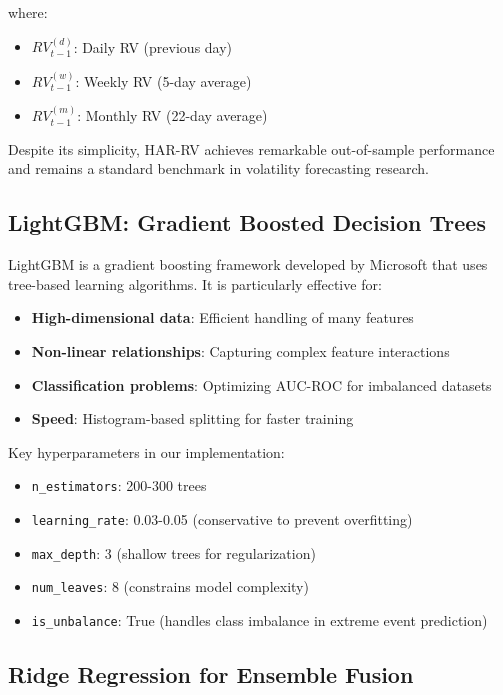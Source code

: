 \documentclass[12pt,a4paper]{article}
\begin{document}
where:
\begin{itemize}
    \item $RV_{t-1}^{(d)}$: Daily RV (previous day)
    \item $RV_{t-1}^{(w)}$: Weekly RV (5-day average)
    \item $RV_{t-1}^{(m)}$: Monthly RV (22-day average)
\end{itemize}

Despite its simplicity, HAR-RV achieves remarkable out-of-sample performance and remains a standard benchmark in volatility forecasting research.

\subsection{LightGBM: Gradient Boosted Decision Trees}

LightGBM is a gradient boosting framework developed by Microsoft that uses tree-based learning algorithms. It is particularly effective for:

\begin{itemize}
    \item \textbf{High-dimensional data}: Efficient handling of many features
    \item \textbf{Non-linear relationships}: Capturing complex feature interactions
    \item \textbf{Classification problems}: Optimizing AUC-ROC for imbalanced datasets
    \item \textbf{Speed}: Histogram-based splitting for faster training
\end{itemize}

Key hyperparameters in our implementation:
\begin{itemize}
    \item \texttt{n\_estimators}: 200-300 trees
    \item \texttt{learning\_rate}: 0.03-0.05 (conservative to prevent overfitting)
    \item \texttt{max\_depth}: 3 (shallow trees for regularization)
    \item \texttt{num\_leaves}: 8 (constrains model complexity)
    \item \texttt{is\_unbalance}: True (handles class imbalance in extreme event prediction)
\end{itemize}

\subsection{Ridge Regression for Ensemble Fusion}
\end{document}

